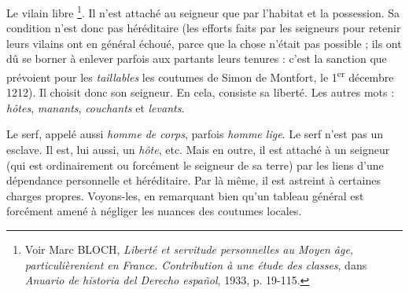 \documentclass[french,twoside]{book} %
\begin{document}
\begin{listalpha}[itemsep=0pt,]
\item[] \hspace{-1.5em}{\bfseries Distinction de deux classes, par catégorie de liens :}
\item Le vilain libre \footnote{ Voir Marc BLOCH, {\itshape Liberté et servitude personnelles au Moyen âge, particulièrenient en France. Contribution à une étude des classes}, dans {\itshape Anuario de historia del Derecho español}, 1933, p. 19-115.}. Il n’est attaché au seigneur que par l’habitat et la possession. Sa condition n’est donc pas héréditaire (les efforts faits par les seigneurs pour retenir leurs vilains ont en général échoué, parce que la chose n’était pas possible ; ils ont dû se borner à enlever parfois aux partants leurs tenures : c’est la sanction que prévoient pour les \emph{taillables} les coutumes de Simon de Montfort, le 1\textsuperscript{er} décembre 1212). Il choisit donc son seigneur. En cela, consiste sa liberté. Les autres mots : \emph{hôtes}, \emph{manants}, \emph{couchants} et \emph{levants}.
\item Le serf, appelé aussi \emph{homme de corps}, parfois \emph{homme lige}. Le serf n’est pas un esclave. Il est, lui aussi, un \emph{hôte}, etc. Mais en outre, il est attaché à un seigneur (qui est ordinairement ou forcément le seigneur de sa terre) par les liens d’une dépendance personnelle et héréditaire. Par là même, il est astreint à certaines charges propres. Voyons-les, en remarquant bien qu’un tableau général est forcément amené à négliger les nuances des coutumes locales.

\end{listalpha}
\end{document}
